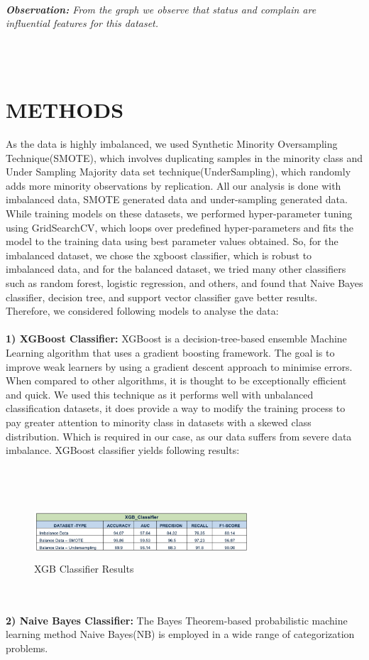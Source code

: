 \documentclass[a4paper, 10pt, conference]{ieeeconf}      %
\begin{document}
\\\textit{\textbf{Observation:} From the graph we observe that status and complain are influential features for this dataset.}

\\\
\section{\textbf{METHODS}}
As the data is highly imbalanced, we used Synthetic Minority Oversampling Technique(SMOTE), which involves duplicating samples in the minority class and Under Sampling Majority data set technique(UnderSampling), which randomly adds more minority observations by replication.
All our analysis is done with imbalanced data, SMOTE generated data and under-sampling generated data. While training models on these datasets, we performed hyper-parameter tuning using GridSearchCV, which loops over predefined hyper-parameters and fits the model to the training data using best parameter values obtained.
So, for the imbalanced dataset, we chose the xgboost classifier, which is robust to imbalanced data, and for the balanced dataset, we tried many other classifiers such as random forest, logistic regression, and others, and found that Naive Bayes classifier, decision tree, and support vector classifier gave better results.
Therefore, we considered following models to analyse the data:
\\\
\\\textbf{1) XGBoost Classifier:}
XGBoost is a decision-tree-based ensemble Machine Learning algorithm that uses a gradient boosting framework. The goal is to improve weak learners by using a gradient descent approach to minimise errors. When compared to other algorithms, it is thought to be exceptionally efficient and quick. We used this technique as it performs well with  unbalanced classification datasets, it does provide a way to modify the training process to pay greater attention to minority class in datasets with a skewed class distribution. Which is required in our case, as our data suffers from severe data imbalance.
XGBoost classifier yields following results:

\\\
\begin{figure}[htp]
    \centering
    \includegraphics[width=8cm,height=2cm]{Images/xgbclassifier.png}
    \caption{XGB Classifier Results}
    \label{fig:xgbclassifier}
\end{figure}
\\\
\\\textbf{2) Naive Bayes Classifier:} The Bayes Theorem-based probabilistic machine learning method Naive Bayes(NB) is employed in a wide range of categorization problems.
\end{document}
